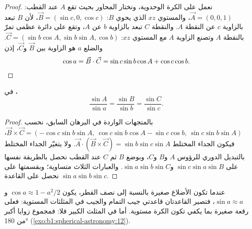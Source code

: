 \begin{proof}
نعمل على الكرة الوحدوية، ونختار المحاور بحيث تقع $A$ عند القطب:
$\vec A = (0, 0, 1)$، والمستوي $xz$ الذي يحوي $B$:
$\vec B = (\sin c, 0, \cos c)$، لأن $B$ تبعد بالزاوية $c$ عن النقطة $A$.
والنقطة $C$ تبعد بالزاوية $b$ عن $A$، وتقع على دائرة عظمى تمرّ بالنقطة $A$ وتصنع الزاوية $A$ مع المستوي $xz$:
$\vec C = (\sin b\cos A, \sin b\sin A, \cos b)$. والضلع $a$ هو الزاوية بين $\vec B$ و$\vec C$، إذن
\[
  \cos a = \vec B\cdot\vec C = \sin c\sin b\cos A + \cos c\cos b. \qedhere
\]
\end{proof}

\begin{theorem}\label{thm:b1:spherical-astronomy:sine-rule}
في ،
\[
  \frac{\sin A}{\sin a} = \frac{\sin B}{\sin b} = \frac{\sin C}{\sin c}.
\]
\end{theorem}

\begin{proof}
بالمتجهات الواردة في البرهان السابق، نحسب
$\vec B \times \vec C = (-\cos c\sin b\sin A,\ \cos c\sin b\cos A - \sin c\cos b,\
\sin c\sin b\sin A)$، فيكون الجداء المختلط
$\vec A\cdot(\vec B\times\vec C) = \sin b\sin c\sin A$. ولا يتغيّر الجداء المختلط بالتبديل الدوري للرؤوس $A$ و$B$ و$C$، وبوضع $B$ ثم $C$ عند القطب نحصل بالطريقة نفسها على $\sin c\sin a\sin B$ و$\sin a\sin b\sin
C$. والعبارات الثلاث متساوية؛ وبقسمتها على $\sin a\sin b\sin c$ نحصل على القاعدة.
\end{proof}

عندما تكون الأضلاع صغيرة بالنسبة إلى نصف القطر، يكون $\cos a \approx 1 -
a^2/2$ و$\sin a \approx a$، فتصير القاعدتان قاعدتي جيب التمام والجيب في المثلثات المستوية: فعلى رقعة صغيرة بما يكفي تكون الكرة مستوية. أما في المثلث الكبير فلا: فمجموع زوايا  أكبر من \ang{180} (\cref{exo:b1:spherical-astronomy:12}).

